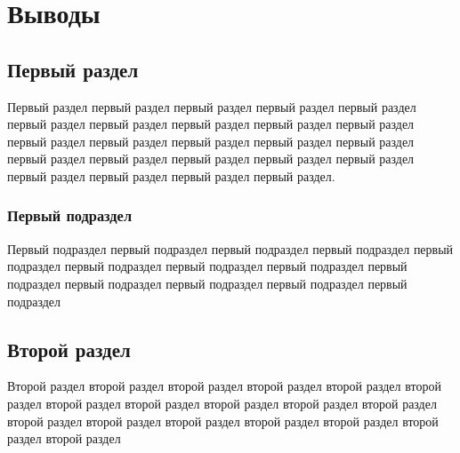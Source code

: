 \section{Выводы}

\subsection{Первый раздел}
    Первый раздел первый раздел первый раздел первый раздел первый раздел первый раздел первый раздел первый раздел первый раздел первый раздел первый раздел первый раздел первый раздел первый раздел первый раздел первый раздел первый раздел первый раздел первый раздел первый раздел первый раздел первый раздел первый раздел первый раздел. 
    
    \subsubsection{Первый подраздел}
        Первый подраздел первый подраздел первый подраздел первый подраздел первый подраздел первый подраздел первый подраздел первый подраздел первый подраздел первый подраздел первый подраздел первый подраздел первый подраздел 

\subsection{Второй раздел}
    Второй раздел второй раздел второй раздел второй раздел второй раздел второй раздел второй раздел второй раздел второй раздел второй раздел второй раздел второй раздел второй раздел второй раздел второй раздел второй раздел второй раздел второй раздел 
    
        
\clearpage